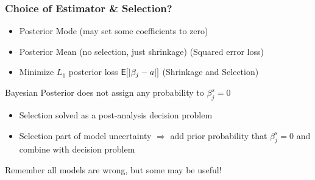 \documentclass[]{beamer}
\begin{document}
\begin{frame}
  \frametitle{Choice of Estimator \& Selection?}

  \begin{itemize}
  \item Posterior Mode (may set some coefficients to zero) \pause
  \item Posterior Mean (no selection, just shrinkage) (Squared error loss)
  \item Minimize $L_1$ posterior loss  $\textsf{E}[|\beta_j - a |]$  (Shrinkage and Selection) \pause
  \end{itemize}
  Bayesian Posterior does not assign any probability to $\beta^s_j = 0$ \pause

  \begin{itemize}
  \item Selection solved as a post-analysis decision problem \pause
  \item Selection part of model uncertainty $\Rightarrow$ add prior \pause
    probability that $\beta^s_j = 0$  and combine with decision problem
  \end{itemize}
Remember all models are wrong, but some may be useful!
\end{frame}
\end{document}
